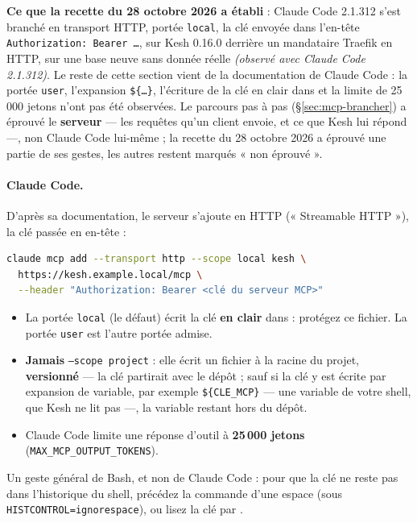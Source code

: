 \documentclass[a4paper,11pt,oneside]{article}
\begin{document}
\textbf{Ce que la recette du 28 octobre 2026 a établi} : Claude Code 2.1.312 s'est branché en transport HTTP, portée \texttt{local}, la clé envoyée dans l'en-tête \texttt{Authorization: Bearer \ldots}, sur Kesh 0.16.0 derrière un mandataire Traefik en HTTP, sur une base neuve sans donnée réelle \emph{(observé avec Claude Code 2.1.312)}. Le reste de cette section vient de la documentation de Claude Code : la portée \texttt{user}, l'expansion \texttt{\$\{\ldots\}}, l'écriture de la clé en clair dans  et la limite de 25\,000 jetons n'ont pas été observées. Le parcours pas à pas (\S\ref{sec:mcp-brancher}) a éprouvé le \textbf{serveur} --- les requêtes qu'un client envoie, et ce que Kesh lui répond ---, non Claude Code lui-même ; la recette du 28 octobre 2026 a éprouvé une partie de ses gestes, les autres restent marqués « non éprouvé ».

\paragraph{Claude Code.} D'après sa documentation, le serveur s'ajoute en HTTP (« Streamable HTTP »), la clé passée en en-tête :
\begin{lstlisting}[language=bash]
claude mcp add --transport http --scope local kesh \
  https://kesh.example.local/mcp \
  --header "Authorization: Bearer <clé du serveur MCP>"
\end{lstlisting}
\begin{itemize}
    \item La portée \texttt{local} (le défaut) écrit la clé \textbf{en clair} dans  : protégez ce fichier. La portée \texttt{user} est l'autre portée admise.
    \item \textbf{Jamais} \texttt{--scope project} : elle écrit un fichier  à la racine du projet, \textbf{versionné} --- la clé partirait avec le dépôt ; sauf si la clé y est écrite par expansion de variable, par exemple \texttt{\$\{CLE\_MCP\}} --- une variable de votre shell, que Kesh ne lit pas ---, la variable restant hors du dépôt.
    \item Claude Code limite une réponse d'outil à \textbf{25\,000 jetons} (\texttt{MAX\_MCP\_OUTPUT\_TOKENS}).
\end{itemize}
Un geste général de Bash, et non de Claude Code : pour que la clé ne reste pas dans l'historique du shell, précédez la commande d'une espace (sous \texttt{HISTCONTROL=ignorespace}), ou lisez la clé par .
\end{document}
